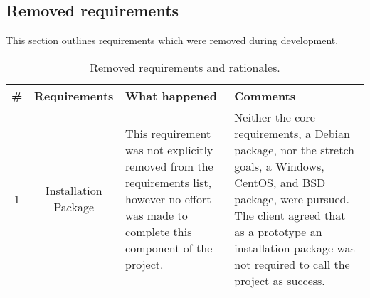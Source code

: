\subsection{Removed requirements}

This section outlines requirements which were removed during development.

\begin{table}[H]
  \begin{center}
    \begin{tabular}{ | c | c | p{7cm} | p{6cm} | }
      \hline
      \# & Requirements & What happened & Comments \\ \hline
      1 & Installation Package &
        This requirement was not explicitly removed from the requirements list, however no effort was made to complete this component of the project. & 
        Neither the core requirements, a Debian package, nor the stretch goals, a Windows, CentOS, and BSD package, were pursued.
        The client agreed that as a prototype an installation package was not required to call the project as success. \\ \hline
    \end{tabular}
  \end{center}
  \caption{Removed requirements and rationales.}
\end{table}
